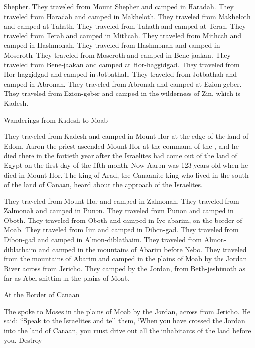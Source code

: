 {Shepher.
They traveled
from Mount
Shepher
and camped
in Haradah.
They traveled
from Haradah
and camped
in Makheloth.
They traveled
from Makheloth
and camped
at Tahath.
They traveled
from Tahath
and camped
at Terah.
They traveled
from Terah
and camped
in Mithcah.
They traveled
from Mithcah
and camped
in Hashmonah.
They traveled
from Hashmonah
and camped
in Moseroth.
They traveled
from Moseroth
and camped
in Bene-jaakan.
They traveled
from Bene-jaakan
and camped
at Hor-haggidgad.
They traveled
from Hor-haggidgad
and camped
in Jotbathah.
They traveled
from Jotbathah
and camped
in Abronah.
They traveled
from Abronah
and camped
at Ezion-geber.
They traveled
from Ezion-geber
and camped
in the wilderness
of Zin,
which is
Kadesh.
\par }{\SH Wanderings from Kadesh to Moab
\par }{\PP {}They traveled
from Kadesh
and camped
in Mount
Hor
at the edge
of the land
of Edom.
Aaron
the priest
ascended
Mount
Hor
at the command
of the {}, and he died
there
in the fortieth
year
after the Israelites
had come out
of the land
of Egypt
on the first
day of the fifth
month.
Now Aaron
was 123
years
old
when he died
in Mount
Hor.
The king
of Arad,
the Canaanite
king who lived in
the south
of the land
of Canaan,
heard
about the approach
of the Israelites.
\par }{\PP {}They traveled
from Mount
Hor
and camped
in Zalmonah.
They traveled
from Zalmonah
and camped
in Punon.
They traveled
from Punon
and camped
in Oboth.
They traveled
from Oboth
and camped
in Iye-abarim,
on the border
of Moab.
They traveled
from Iim
and camped
in Dibon-gad.
They traveled
from Dibon-gad
and camped
in Almon-diblathaim.
They traveled
from Almon-diblathaim
and camped
in the mountains
of Abarim
before
Nebo.
They traveled
from the mountains
of Abarim
and camped
in the plains
of Moab
by
the Jordan River
across from Jericho.
They camped
by
the Jordan,
from Beth-jeshimoth
as far
as Abel-shittim
in the plains
of Moab.
\par }{\SH At the Border of Canaan
\par }{\PP {}The
{}
spoke
to
Moses
in the plains
of Moab
by
the Jordan,
across from Jericho.
He said:
“Speak
to
the Israelites
and tell
them,
‘When
you
have crossed
the Jordan
into
the land
of Canaan,
you must drive out
all
the inhabitants
of the land
before
you. Destroy
}
